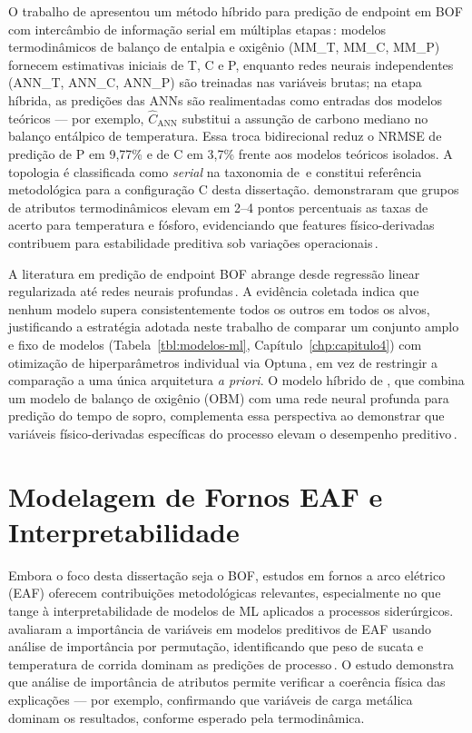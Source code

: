 O trabalho de \citeauthor{chattopadhyay2022hybrid} apresentou um método híbrido para predição de endpoint em BOF com intercâmbio de informação serial em múltiplas etapas\,\cite{chattopadhyay2022hybrid}: modelos termodinâmicos de balanço de entalpia e oxigênio (MM\_T, MM\_C, MM\_P) fornecem estimativas iniciais de T, C e P, enquanto redes neurais independentes (ANN\_T, ANN\_C, ANN\_P) são treinadas nas variáveis brutas; na etapa híbrida, as predições das ANNs são realimentadas como entradas dos modelos teóricos — por exemplo, $\hat{C}_\text{ANN}$ substitui a assunção de carbono mediano no balanço entálpico de temperatura. Essa troca bidirecional reduz o NRMSE de predição de P em 9{,}77\% e de C em 3{,}7\% frente aos modelos teóricos isolados. A topologia é classificada como \textit{serial} na taxonomia de\,\cite{willard2020integrating} e constitui referência metodológica para a configuração C desta dissertação. \citeauthor{bae2020bof} demonstraram que grupos de atributos termodinâmicos elevam em 2–4 pontos percentuais as taxas de acerto para temperatura e fósforo, evidenciando que features físico-derivadas contribuem para estabilidade preditiva sob variações operacionais\,\cite{bae2020bof}.

A literatura em predição de endpoint BOF abrange desde regressão linear regularizada até redes neurais profundas\,\cite{zhou2024bof,chattopadhyay2022hybrid}. A evidência coletada indica que nenhum modelo supera consistentemente todos os outros em todos os alvos, justificando a estratégia adotada neste trabalho de comparar um conjunto amplo e fixo de modelos (Tabela~\ref{tbl:modelos-ml}, Capítulo~\ref{chp:capitulo4}) com otimização de hiperparâmetros individual via Optuna\,\cite{akiba2019optuna}, em vez de restringir a comparação a uma única arquitetura \textit{a priori}. O modelo híbrido de \citeauthor{shao2024hybrid}, que combina um modelo de balanço de oxigênio (OBM) com uma rede neural profunda para predição do tempo de sopro, complementa essa perspectiva ao demonstrar que variáveis físico-derivadas específicas do processo elevam o desempenho preditivo\,\cite{shao2024hybrid}.

\section{Modelagem de Fornos EAF e Interpretabilidade}
\label{sec:eaf-interpretabilidade}

Embora o foco desta dissertação seja o BOF, estudos em fornos a arco elétrico (EAF) oferecem contribuições metodológicas relevantes, especialmente no que tange à interpretabilidade de modelos de ML aplicados a processos siderúrgicos. \citeauthor{skrjanc2022eaf} avaliaram a importância de variáveis em modelos preditivos de EAF usando análise de importância por permutação, identificando que peso de sucata e temperatura de corrida dominam as predições de processo\,\cite{skrjanc2022eaf}. O estudo demonstra que análise de importância de atributos permite verificar a coerência física das explicações — por exemplo, confirmando que variáveis de carga metálica dominam os resultados, conforme esperado pela termodinâmica.


